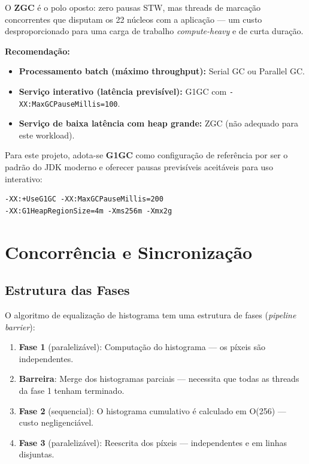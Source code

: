 \documentclass[a4paper,11pt,openright,BCOR=15mm]{scrbook}
\begin{document}
O \textbf{ZGC} é o polo oposto: zero pausas STW, mas threads de marcação concorrentes que disputam os 22 núcleos com a aplicação --- um custo desproporcionado para uma carga de trabalho \textit{compute-heavy} e de curta duração.

\textbf{Recomendação:}
\begin{itemize}
    \item \textbf{Processamento batch (máximo throughput):} Serial GC ou Parallel GC.
    \item \textbf{Serviço interativo (latência previsível):} G1GC com \texttt{-XX:MaxGCPauseMillis=100}.
    \item \textbf{Serviço de baixa latência com heap grande:} ZGC (não adequado para este workload).
\end{itemize}

Para este projeto, adota-se \textbf{G1GC} como configuração de referência por ser o padrão do JDK moderno e oferecer pausas previsíveis aceitáveis para uso interativo:
\begin{Verbatim}
-XX:+UseG1GC -XX:MaxGCPauseMillis=200
-XX:G1HeapRegionSize=4m -Xms256m -Xmx2g
\end{Verbatim}

\chapter{Concorrência e Sincronização}

\section{Estrutura das Fases}

O algoritmo de equalização de histograma tem uma estrutura de fases (\textit{pipeline barrier}):

\begin{enumerate}
    \item \textbf{Fase 1} (paralelizável): Computação do histograma — os píxeis são independentes.
    \item \textbf{Barreira}: Merge dos histogramas parciais — necessita que todas as threads da fase 1 tenham terminado.
    \item \textbf{Fase 2} (sequencial): O histograma cumulativo é calculado em O(256) --- custo negligenciável.
    \item \textbf{Fase 3} (paralelizável): Reescrita dos píxeis — independentes e em linhas disjuntas.
\end{enumerate}
\end{document}
